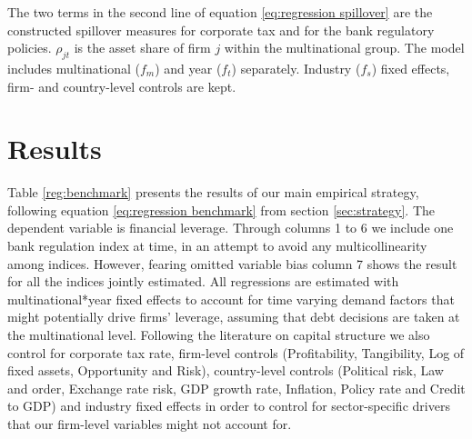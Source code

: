 \documentclass[12pt]{article}
\begin{document}
  The two terms in the second line of equation \ref{eq:regression spillover} are the constructed spillover measures for corporate tax and for the bank regulatory policies. $\rho_{jt}$ is the asset share of firm $j$ within the multinational group. The model includes multinational ($f_{m}$) and year ($f_{t}$) separately. Industry ($f_s$) fixed effects, firm- and country-level controls are kept. 
	 
	\section{Results} \label{sec:result}
	 Table \ref{reg:benchmark} presents the results of our main empirical strategy, following equation \ref{eq:regression benchmark} from section \ref{sec:strategy}. The dependent variable is financial leverage. Through columns 1 to 6 we include one bank regulation index at time, in an attempt to avoid any multicollinearity among indices. However, fearing omitted variable bias column 7 shows the result for all the indices jointly estimated. All regressions are estimated with multinational*year fixed effects to account for time varying demand factors that might potentially drive firms' leverage, assuming that debt decisions are taken at the multinational level. Following the literature on capital structure we also control for corporate tax rate, firm-level controls (Profitability, Tangibility, Log of fixed assets, Opportunity and Risk), country-level controls (Political risk, Law and order, Exchange rate risk, GDP growth rate, Inflation, Policy rate and Credit to GDP) and industry fixed effects in order to control for sector-specific drivers that our firm-level variables might not account for.
	 
\end{document}

